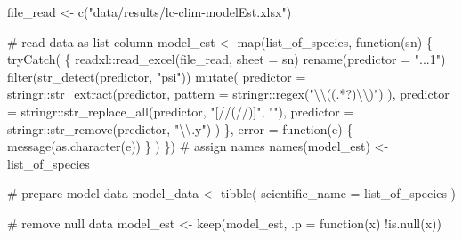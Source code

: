 \documentclass[
]{article}
\newenvironment{Shaded}{}{}
\newcommand{\CharTok}[1]{\textcolor[rgb]{0.00,0.50,0.50}{#1}}
\newcommand{\CommentTok}[1]{\textcolor[rgb]{0.00,0.50,0.00}{#1}}
\newcommand{\ControlFlowTok}[1]{\textcolor[rgb]{0.00,0.00,1.00}{#1}}
\newcommand{\DataTypeTok}[1]{#1}
\newcommand{\KeywordTok}[1]{\textcolor[rgb]{0.00,0.00,1.00}{#1}}
\newcommand{\NormalTok}[1]{#1}
\newcommand{\OperatorTok}[1]{#1}
\newcommand{\StringTok}[1]{\textcolor[rgb]{0.00,0.50,0.50}{#1}}
\begin{document}
\begin{Shaded}
\begin{Highlighting}[]
\NormalTok{file_read <-}\StringTok{ }\KeywordTok{c}\NormalTok{(}\StringTok{"data/results/lc-clim-modelEst.xlsx"}\NormalTok{)}

\CommentTok{# read data as list column}
\NormalTok{model_est <-}\StringTok{ }\KeywordTok{map}\NormalTok{(list_of_species, }\ControlFlowTok{function}\NormalTok{(sn) \{}
  \KeywordTok{tryCatch}\NormalTok{(}
\NormalTok{    \{}
\NormalTok{      readxl}\OperatorTok{::}\KeywordTok{read_excel}\NormalTok{(file_read, }\DataTypeTok{sheet =}\NormalTok{ sn) }\OperatorTok{%
\StringTok{        }\KeywordTok{rename}\NormalTok{(}\DataTypeTok{predictor =} \StringTok{"...1"}\NormalTok{) }\OperatorTok{%
\StringTok{        }\KeywordTok{filter}\NormalTok{(}\KeywordTok{str_detect}\NormalTok{(predictor, }\StringTok{"psi"}\NormalTok{)) }\OperatorTok{%
\StringTok{        }\KeywordTok{mutate}\NormalTok{(}
          \DataTypeTok{predictor =}\NormalTok{ stringr}\OperatorTok{::}\KeywordTok{str_extract}\NormalTok{(predictor,}
            \DataTypeTok{pattern =}\NormalTok{ stringr}\OperatorTok{::}\KeywordTok{regex}\NormalTok{(}\StringTok{"}\CharTok{\textbackslash{}\textbackslash{}}\StringTok{((.*?)}\CharTok{\textbackslash{}\textbackslash{}}\StringTok{)"}\NormalTok{)}
\NormalTok{          ),}
          \DataTypeTok{predictor =}\NormalTok{ stringr}\OperatorTok{::}\KeywordTok{str_replace_all}\NormalTok{(predictor, }\StringTok{"[//(//)]"}\NormalTok{, }\StringTok{""}\NormalTok{),}
          \DataTypeTok{predictor =}\NormalTok{ stringr}\OperatorTok{::}\KeywordTok{str_remove}\NormalTok{(predictor, }\StringTok{"}\CharTok{\textbackslash{}\textbackslash{}}\StringTok{.y"}\NormalTok{)}
\NormalTok{        )}
\NormalTok{    \},}
    \DataTypeTok{error =} \ControlFlowTok{function}\NormalTok{(e) \{}
      \KeywordTok{message}\NormalTok{(}\KeywordTok{as.character}\NormalTok{(e))}
\NormalTok{    \}}
\NormalTok{  )}
\NormalTok{\})}
\CommentTok{# assign names}
\KeywordTok{names}\NormalTok{(model_est) <-}\StringTok{ }\NormalTok{list_of_species}

\CommentTok{# prepare model data}
\NormalTok{model_data <-}\StringTok{ }\KeywordTok{tibble}\NormalTok{(}
  \DataTypeTok{scientific_name =}\NormalTok{ list_of_species}
\NormalTok{)}

\CommentTok{# remove null data}
\NormalTok{model_est <-}\StringTok{ }\KeywordTok{keep}\NormalTok{(model_est, }\DataTypeTok{.p =} \ControlFlowTok{function}\NormalTok{(x) }\OperatorTok{!}\KeywordTok{is.null}\NormalTok{(x))}

}}}
\end{Highlighting}
\end{Shaded}
\end{document}
